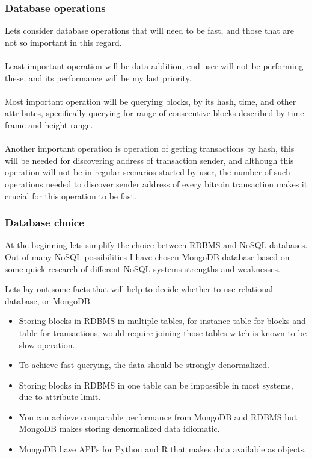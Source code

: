 \documentclass[12pt, en, eng]{mgr}
\begin{document}
\subsubsection{Database operations}
Lets consider database operations that will need to be fast, and those that are not so important in this regard.
\\
\\
Least important operation will be data addition, end user will not be performing these, and its performance will be my last priority.
\\
\\
Most important operation will be querying blocks, by its hash, time, and other attributes, specifically querying for range of consecutive blocks described by time frame and height range.
\\
\\
Another important operation is operation of getting transactions by hash, this will be needed for discovering address of transaction sender, and although this operation will not be in regular scenarios started by user, the number of such operations needed to discover sender address of every bitcoin transaction makes it crucial for this operation to be fast.

\subsubsection{Database choice}
At the beginning lets simplify the choice between RDBMS and NoSQL databases. Out of many NoSQL possibilities I have chosen MongoDB database based on some quick research of different NoSQL systems strengths and weaknesses.

Lets lay out some facts that will help to decide whether to use relational database, or MongoDB

\begin{itemize}
\item 
Storing blocks in RDBMS in multiple tables, for instance table for blocks and table for transactions, would require joining those tables witch is known to be slow operation.
\item 
To achieve fast querying, the data should be strongly denormalized.
\item
Storing blocks in RDBMS in one table can be impossible in most systems, due to attribute limit.
\item 
You can achieve comparable performance from MongoDB and RDBMS but MongoDB makes storing denormalized data idiomatic.
\item
MongoDB have API's for Python and R that makes data available as objects.
\end{itemize}
\end{document}

